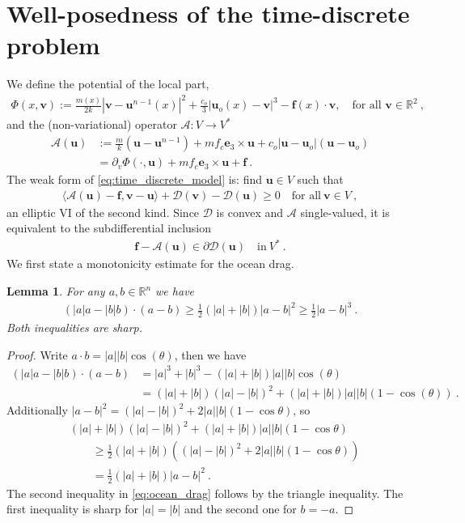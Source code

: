 \documentclass{article}
\newtheorem{lemma}[theorem]{Lemma}
\theoremstyle{definition}
\newcommand{\bfu}{\boldsymbol{u}}
\newcommand{\bfv}{\boldsymbol{v}}
\newcommand{\bfe}{\boldsymbol{e}}
\newcommand{\bff}{\boldsymbol{f}}
\newcommand{\D}{\mathcal{D}}
\begin{document}
\section{Well-posedness of the time-discrete problem}\label{sec:td}
We define the potential of the local part,
\begin{align}
    \Phi(x,\bfv) := \frac{m(x)}{2k} |\bfv - \bfu^{n-1}(x)|^2  + \frac{c_o}{3} |\bfu_o (x) -\bfv|^3 - \bff(x)\cdot \bfv, \quad\text{for all }\bfv\in\mathbb R^2\ ,
\end{align}
and the (non-variational) operator $\mathcal{A} : V \rightarrow V^{*}$
\begin{align*}
    \mathcal{A} (\bfu) &:= \frac m k (\bfu -\bfu^{n-1}) + m f_c \bfe_3 \times \bfu + c_o |\bfu-\bfu_o|(\bfu-\bfu_o)\\
    &= \partial_v \Phi(\cdot,\bfu) + mf_c\bfe_3 \times \bfu +\bff \ .
\end{align*}
The weak form of \eqref{eq:time_discrete_model} is: find $\bfu \in V$ such that
\begin{align}
    \langle \mathcal{A}(\bfu)-\bff, \bfv-\bfu\rangle + \D(\bfv) -\D(\bfu) \geq 0 \quad \text{for all}\ \bfv\in V \ , \label{eq:vi_td}
\end{align}
an elliptic VI of the second kind. Since $\D$ is convex and $\mathcal{A}$ single-valued, it is equivalent
to the subdifferential inclusion
\begin{align}
    \bff - \mathcal{A} (\bfu) \in \partial\D(\bfu) \quad \text{in} \ V^{*} \ .
    \label{eq:sub_vi_td}
\end{align}
We first state a monotonicity estimate for the ocean drag.
\begin{lemma}\label{lem:drag}
    For any $a,b\in\mathbb R^{n}$ we have
    \begin{align}
        (|a|a-|b|b) \cdot (a-b) \geq \frac{1}{2} (|a|+|b|)|a-b|^{2} \geq \frac 1 2 |a-b|^{3} \ . \label{eq:ocean_drag}
    \end{align}
    Both inequalities are sharp.
\end{lemma}
\begin{proof}
    Write $a\cdot b = |a||b|\cos(\theta)$, then we have
 \begin{align*}
      (|a|a-|b|b) \cdot (a-b) &= |a|^{3} + |b|^{3} -(|a|+|b|)|a||b|\cos(\theta) \\
      &= (|a| + |b|) (|a| - |b|)^{2} +(|a|+|b|)|a||b|(1-\cos(\theta)) \ .
 \end{align*}
 Additionally $|a-b|^2 = (|a|-|b|)^2+2|a||b|(1-\cos\theta)$, so
 \begin{align*}
    &(|a|+|b|)(|a|-|b|)^2 + (|a|+|b|)|a||b|(1-\cos\theta)\\
    &\qquad\geq \frac 1 2
    (|a|+|b|)\left((|a|-|b|)^2+2|a||b|(1-\cos\theta)\right)\\
    &\qquad= \frac 1 2 (|a|+|b|)|a-b|^{2} \ .
 \end{align*}
 The second inequality in \eqref{eq:ocean_drag} follows by the triangle inequality. The first inequality is sharp for $|a|=|b|$ and the second one
 for $b=-a$.
\end{proof}
\end{document}
